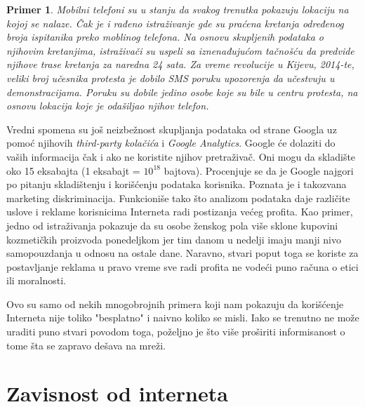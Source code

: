 \documentclass[a4paper]{article}
\newtheorem{primer}{Primer}[section]
\begin{document}
\begin{primer}
	Mobilni telefoni su u stanju da svakog trenutka pokazuju lokaciju na kojoj se nalaze. Čak je i rađeno istraživanje gde su praćena kretanja određenog broja ispitanika preko moblinog telefona. Na osnovu skupljenih podataka o njihovim kretanjima, istraživači su uspeli sa iznenađujućom tačnošću da predvide njihove trase kretanja za naredna 24 sata. Za vreme revolucije u Kijevu, 2014-te, veliki broj učesnika protesta je dobilo SMS poruku upozorenja da učestvuju u demonstracijama. Poruku su dobile jedino osobe koje su bile u centru protesta, na osnovu lokacija koje je odašiljao njihov telefon. \cite{?}
\end{primer}

	Vredni spomena su još neizbežnost skupljanja podataka od strane Googla uz pomoć njihovih \textit{third-party kolačića} i \textit{Google Analytics}. Google će dolaziti do vaših informacija čak i ako ne koristite njihov pretraživač. Oni mogu da skladište oko 15 eksabajta (1 eksabajt = $10^{18}$ bajtova). Procenjuje se da je Google najgori po pitanju skladištenju i korišćenju podataka korisnika. Poznata je i takozvana marketing diskriminacija. Funkcioniše tako što analizom podataka daje različite uslove i reklame korisnicima Interneta radi postizanja većeg profita. Kao primer, jedno od istraživanja pokazuje da su osobe ženskog pola više sklone kupovini kozmetičkih proizvoda ponedeljkom jer tim danom u nedelji imaju manji nivo samopouzdanja u odnosu na ostale dane. Naravno, stvari poput toga se koriste za postavljanje reklama u pravo vreme sve radi profita ne vodeći puno računa o etici ili moralnosti. \cite{?}

	Ovo su samo od nekih mnogobrojnih primera koji nam pokazuju da korišćenje Interneta nije toliko "besplatno" i naivno koliko se misli. Iako se trenutno ne može uraditi puno stvari povodom toga, poželjno je što više proširiti informisanost o tome šta se zapravo dešava na mreži.

\section{Zavisnost od interneta}

\appendix
 

\appendix
\end{document}
